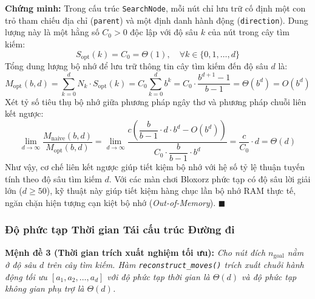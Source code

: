 \noindent
\textbf{Chứng minh:}
Trong cấu trúc \texttt{SearchNode}, mỗi nút chỉ lưu trữ cố định một con trỏ tham chiếu địa chỉ
(\texttt{parent}) và một định danh hành động (\texttt{direction}). Dung lượng này là một hằng số
$C_0 > 0$ độc lập với độ sâu $k$ của nút trong cây tìm kiếm:
\begin{equation}
    S_{\text{opt}}(k) = C_0 = \Theta(1), \quad \forall k \in \{0, 1, \dots, d\}
\end{equation}
Tổng dung lượng bộ nhớ để lưu trữ thông tin cây tìm kiếm đến độ sâu $d$ là:
\begin{equation}
    M_{\text{opt}}(b, d) = \sum_{k=0}^{d} N_k \cdot S_{\text{opt}}(k)
    = C_0 \sum_{k=0}^{d} b^k
    = C_0 \cdot \frac{b^{d+1} - 1}{b - 1} = \Theta(b^d) = O(b^d)
\end{equation}
Xét tỷ số tiêu thụ bộ nhớ giữa phương pháp ngây thơ và phương pháp chuỗi liên kết ngược:
\begin{equation}
    \lim_{d \to \infty} \frac{M_{\text{naive}}(b, d)}{M_{\text{opt}}(b, d)}
    = \lim_{d \to \infty} \frac{c \left( \dfrac{b}{b - 1} \cdot d \cdot b^d - O(b^d) \right)}{C_0 \cdot \dfrac{b}{b - 1} \cdot b^d}
    = \frac{c}{C_0} \cdot d = \Theta(d)
\end{equation}
Như vậy, cơ chế liên kết ngược giúp tiết kiệm bộ nhớ với hệ số tỷ lệ thuận tuyến tính theo độ sâu tìm kiếm $d$.
Với các màn chơi Bloxorz phức tạp có độ sâu lời giải lớn ($d \ge 50$), kỹ thuật này giúp tiết kiệm hàng chục
lần bộ nhớ RAM thực tế, ngăn chặn hiện tượng cạn kiệt bộ nhớ (\textit{Out-of-Memory}). \hfill $\blacksquare$

\subsubsection{Độ phức tạp Thời gian Tái cấu trúc Đường đi}

\noindent
\textbf{Mệnh đề 3 (Thời gian trích xuất nghiệm tối ưu):}
\textit{Cho nút đích $n_{\text{goal}}$ nằm ở độ sâu $d$ trên cây tìm kiếm. Hàm \texttt{reconstruct\_moves()}
trích xuất chuỗi hành động tối ưu $[a_1, a_2, \dots, a_d]$ với độ phức tạp thời gian là $\Theta(d)$
và độ phức tạp không gian phụ trợ là $\Theta(d)$.}

